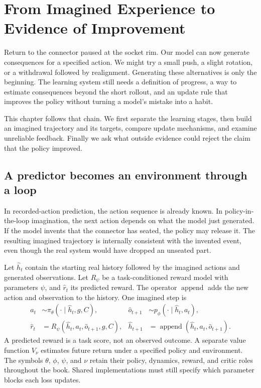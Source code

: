 \chapter{From Imagined Experience to Evidence of Improvement}
\label{ch:evaluation}

Return to the connector paused at the socket rim. Our model can now generate consequences for a specified action. We might try a small push, a slight rotation, or a withdrawal followed by realignment. Generating these alternatives is only the beginning. The learning system still needs a definition of progress, a way to estimate consequences beyond the short rollout, and an update rule that improves the policy without turning a model's mistake into a habit.

This chapter follows that chain. We first separate the learning stages, then build an imagined trajectory and its targets, compare update mechanisms, and examine unreliable feedback. Finally we ask what outside evidence could reject the claim that the policy improved.

\section{A predictor becomes an environment through a loop}
In recorded-action prediction, the action sequence is already known. In policy-in-the-loop imagination, the next action depends on what the model just generated. If the model invents that the connector has seated, the policy may release it. The resulting imagined trajectory is internally consistent with the invented event, even though the real system would have dropped an unseated part.

Let $\widehat h_t$ contain the starting real history followed by the imagined actions and generated observations. Let $R_\psi$ be a task-conditioned reward model with parameters $\psi$, and $\widehat r_t$ its predicted reward. The operator $\operatorname{append}$ adds the new action and observation to the history. One imagined step is
\begin{align}
 a_t&\sim\pi_\theta(\cdot\mid\widehat h_t,g,C),&
 \widehat o_{t+1}&\sim p_\phi(\cdot\mid\widehat h_t,a_t),\label{eq:middle-rollout}\\
 \widehat r_t&=R_\psi(\widehat h_t,a_t,\widehat o_{t+1},g,C),&
 \widehat h_{t+1}&=\operatorname{append}(\widehat h_t,a_t,\widehat o_{t+1}).
 \label{eq:middle-score}
\end{align}
A predicted reward is a task score, not an observed outcome. A separate value function $V_\nu$ estimates future return under a specified policy and environment. The symbols $\theta$, $\phi$, $\psi$, and $\nu$ retain their policy, dynamics, reward, and critic roles throughout the book. Shared implementations must still specify which parameter blocks each loss updates.

